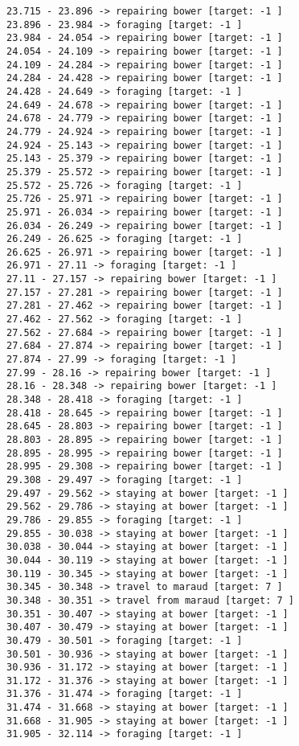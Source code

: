\documentclass[11pt]{article}
\begin{document}
\begin{Verbatim}[commandchars=\\\{\}]
23.715 - 23.896 -> repairing bower [target: -1 ]
23.896 - 23.984 -> foraging [target: -1 ]
23.984 - 24.054 -> repairing bower [target: -1 ]
24.054 - 24.109 -> repairing bower [target: -1 ]
24.109 - 24.284 -> repairing bower [target: -1 ]
24.284 - 24.428 -> repairing bower [target: -1 ]
24.428 - 24.649 -> foraging [target: -1 ]
24.649 - 24.678 -> repairing bower [target: -1 ]
24.678 - 24.779 -> repairing bower [target: -1 ]
24.779 - 24.924 -> repairing bower [target: -1 ]
24.924 - 25.143 -> repairing bower [target: -1 ]
25.143 - 25.379 -> repairing bower [target: -1 ]
25.379 - 25.572 -> repairing bower [target: -1 ]
25.572 - 25.726 -> foraging [target: -1 ]
25.726 - 25.971 -> repairing bower [target: -1 ]
25.971 - 26.034 -> repairing bower [target: -1 ]
26.034 - 26.249 -> repairing bower [target: -1 ]
26.249 - 26.625 -> foraging [target: -1 ]
26.625 - 26.971 -> repairing bower [target: -1 ]
26.971 - 27.11 -> foraging [target: -1 ]
27.11 - 27.157 -> repairing bower [target: -1 ]
27.157 - 27.281 -> repairing bower [target: -1 ]
27.281 - 27.462 -> repairing bower [target: -1 ]
27.462 - 27.562 -> foraging [target: -1 ]
27.562 - 27.684 -> repairing bower [target: -1 ]
27.684 - 27.874 -> repairing bower [target: -1 ]
27.874 - 27.99 -> foraging [target: -1 ]
27.99 - 28.16 -> repairing bower [target: -1 ]
28.16 - 28.348 -> repairing bower [target: -1 ]
28.348 - 28.418 -> foraging [target: -1 ]
28.418 - 28.645 -> repairing bower [target: -1 ]
28.645 - 28.803 -> repairing bower [target: -1 ]
28.803 - 28.895 -> repairing bower [target: -1 ]
28.895 - 28.995 -> repairing bower [target: -1 ]
28.995 - 29.308 -> repairing bower [target: -1 ]
29.308 - 29.497 -> foraging [target: -1 ]
29.497 - 29.562 -> staying at bower [target: -1 ]
29.562 - 29.786 -> staying at bower [target: -1 ]
29.786 - 29.855 -> foraging [target: -1 ]
29.855 - 30.038 -> staying at bower [target: -1 ]
30.038 - 30.044 -> staying at bower [target: -1 ]
30.044 - 30.119 -> staying at bower [target: -1 ]
30.119 - 30.345 -> staying at bower [target: -1 ]
30.345 - 30.348 -> travel to maraud [target: 7 ]
30.348 - 30.351 -> travel from maraud [target: 7 ]
30.351 - 30.407 -> staying at bower [target: -1 ]
30.407 - 30.479 -> staying at bower [target: -1 ]
30.479 - 30.501 -> foraging [target: -1 ]
30.501 - 30.936 -> staying at bower [target: -1 ]
30.936 - 31.172 -> staying at bower [target: -1 ]
31.172 - 31.376 -> staying at bower [target: -1 ]
31.376 - 31.474 -> foraging [target: -1 ]
31.474 - 31.668 -> staying at bower [target: -1 ]
31.668 - 31.905 -> staying at bower [target: -1 ]
31.905 - 32.114 -> foraging [target: -1 ]

\end{Verbatim}
\end{document}
